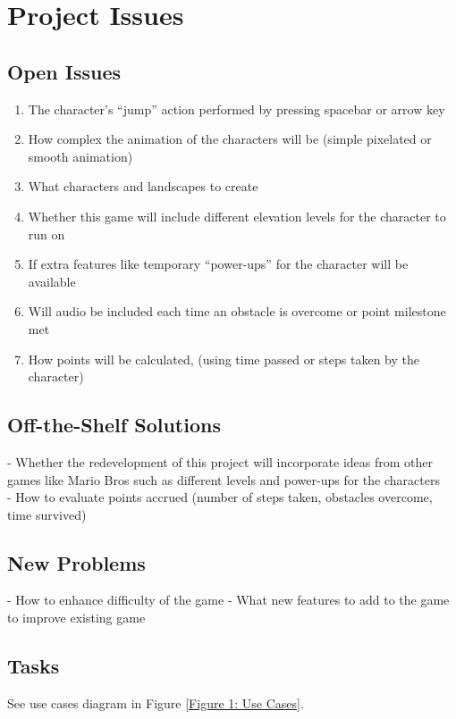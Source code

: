 \documentclass[12pt, titlepage]{article}
\begin{document}
\section{Project Issues}

\subsection{Open Issues}
\begin{enumerate}
\item The character’s “jump” action performed by pressing spacebar or arrow key
\item 	How complex the animation of the characters will be (simple pixelated or smooth animation)
\item 	What characters and landscapes to create
\item 	Whether this game will include different elevation levels for the character to run on
\item 	If extra features like temporary “power-ups” for the character will be available
\item 	Will audio be included each time an obstacle is overcome or point milestone met
\item 	How points will be calculated, (using time passed or steps taken by the character)
\end{enumerate}

\subsection{Off-the-Shelf Solutions}
- Whether the redevelopment of this project will incorporate ideas from other games like Mario Bros such as different levels and power-ups for the characters \\
- How to evaluate points accrued (number of steps taken, obstacles overcome, time survived) \\

\subsection{New Problems}
- How to enhance difficulty of the game
- What new features to add to the game to improve existing game


\subsection{Tasks}
See use cases diagram in Figure \ref{Figure 1: Use Cases}. 
\end{document}
